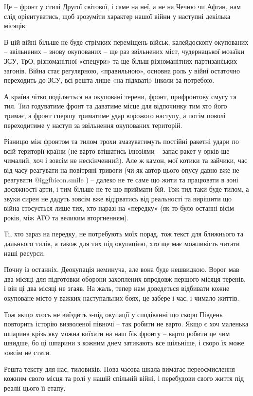 Це – фронт у стилі Другої світової, і саме на неї, а не на Чечню чи Афган, нам
слід орієнтуватись, щоб зрозуміти характер нашої війни у наступні декілька
місяців.

В цій війні більше не буде стрімких переміщень військ, калейдоскопу окупованих
– звільнених – знову окупованих – ще раз звільнених міст, чудернацької мозаїки
ЗСУ, ТрО, різноманітної «спецури» та ще більш різноманітних партизанських
загонів. Війна стає регулярною, «правильною», основна роль у війні остаточно
переходить до ЗСУ, всі решта лише «на підхваті» інколи за потребою.

А країна чітко поділяється на окуповані терени, фронт, прифронтову смугу та
тил. Тил годуватиме фронт та даватиме місце для відпочинку тим хто його тримає,
а фронт спершу триматиме удар ворожого наступу, а потім поволі переходитиме у
наступ за звільнення окупованих територій.

Різницю між фронтом та тилом трохи змазуватимуть постійні ракетні удари по всій
території країни (не варто втішатись ілюзіями – запас ракет у орків ще чималий,
хоч і зовсім не нескінченний). Але ж камон, мої котики та зайчики, час від часу
реагувати на повітряні тривоги (чи як автор цього опусу давно вже не реагувати
 @igg{fbicon.smile}  ) – далеко не те саме що жити та працювати в зоні досяжності арти, і тим
більше не те що приймати бій. Тож тил таки буде тилом, а звуки сирен не дадуть
зовсім вже відірватись від реальності та вирішити що війна стосується лише тих,
хто наразі на «передку» (як то було останні вісім років, між АТО та великим
вторгненням).

Ті, хто зараз на передку, не потребують моїх порад, тож текст для ближнього та
дальнього тилів, а також для тих під окупацією, хто ще має можливість читати
наші ресурси.

Почну із останніх. Деокупація неминуча, але вона буде нешвидкою. Ворог мав два
місяці для підготовки оборони захоплених впродовж першого місяця теренів, і він
ці два місяці не згаяв. На жаль, тепер нам доведеться відбивати кожне окуповане
місто у важких наступальних боях, це забере і час, і чимало життів. 

Тож якщо хтось не виїздить з-під окупації у сподіванні що скоро Південь
повторить історію визволеної півночі – так робити не варто. Якщо є хоч маленька
шпарина крізь яку можна виїхати на наш бік фронту – варто робити це чим швидше,
бо ці шпарини з кожним днем затикають все щільніше, і скоро їх може зовсім не
стати.

Решта тексту для нас, тиловиків. Нова часова шкала вимагає переосмислення
кожним свого місця та ролі у нашій спільній війні, і перебудови свого життя під
реалії цього її етапу.

